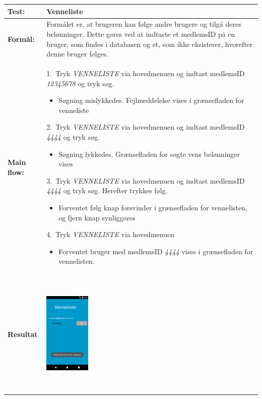   \begin{longtable}{ | l | p{13cm} |} \hline
    \textbf{Test:} & Venneliste \\ \hline
  \textbf{Formål:} & Formålet er, at brugeren kan følge andre brugere og tilgå deres belønninger. Dette gøres ved at indtaste et medlemsID på en bruger, som findes i databasen og et, som ikke eksisterer, hvorefter denne bruger følges.
 \\ \hline
 	\textbf{Main flow:} & 1.~Tryk \textit{VENNELISTE} via hovedmenuen og indtast medlemsID \textit{12345678} og tryk søg.  
 	\begin{itemize}
 	\item Søgning mislykkedes. Fejlmeddelelse vises i grænsefladen for venneliste
 	\end{itemize}	
 	2.~Tryk \textit{VENNELISTE} via hovedmenuen og indtast medlemsID \textit{4444} og tryk søg.
 	\begin{itemize}
 	\item Søgning lykkedes. Grænsefladen for søgte vens belønninger vises
	\end{itemize}
  3.~Tryk \textit{VENNELISTE} via hovedmenuen og indtast medlemsID \textit{4444} og tryk søg. Herefter trykkes følg.
  \begin{itemize}
  \item  Forventet følg knap forsvinder i grænsefladen for vennelisten, og fjern knap synliggøres
  \end{itemize}
  4.~Tryk \textit{VENNELISTE} via hovedmenuen
  \begin{itemize}
  \item Forventet bruger med medlemsID \textit{4444} vises i grænsefladen for vennelisten. 
  \end{itemize} \hspace{0.2mm}\\ \hline
\textbf{Resultat} & \hspace{0.3mm} \raisebox{-\totalheight}    {\includegraphics[width=0.20\textwidth, height=60mm]{figures/test/vennelisteny}} 

\end{longtable}
